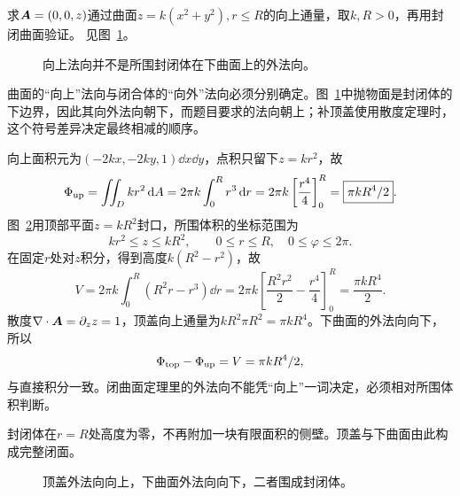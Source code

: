 \begin{exercise}[曲面通量的定向]\label{ex:c4-h4}
求$\bm{A}=(0,0,z)$通过曲面$z=k(x^2+y^2),r\le R$的向上通量，取$k,R>0$，再用封闭曲面验证。 见图~\ref{fig:c4-h4-q}。
\end{exercise}

\begin{figure}[H]\centering
{}
\caption{向上法向并不是所围封闭体在下曲面上的外法向。}\label{fig:c4-h4-q}
\end{figure}
\begin{solution}
曲面的“向上”法向与闭合体的“向外”法向必须分别确定。图~\ref{fig:c4-h4-q}中抛物面是封闭体的下边界，因此其向外法向朝下，而题目要求的法向朝上；补顶盖使用散度定理时，这个符号差异决定最终相减的顺序。


向上面积元为$(-2kx,-2ky,1)\dd x\dd y$，点积只留下$z=k r^2$，故
\[\Phi_{\rm up}=\iint_Dkr^2\mathop{}\!\mathrm d A
=2\pi k\int_0^Rr^3\mathop{}\!\mathrm d r
=2\pi k\left[\frac{r^4}{4}\right]_0^R
=\boxed{\pi kR^4/2}.\]
图~\ref{fig:c4-h4-s}用顶部平面$z=kR^2$封口，所围体积的坐标范围为
\[kr^2\le z\le kR^2,\qquad0\le r\le R,\quad0\le\varphi\le2\pi.\]
在固定$r$处对$z$积分，得到高度$k(R^2-r^2)$，故
\[V=2\pi k\int_0^R(R^2r-r^3)\dd r
=2\pi k\left[\frac{R^2r^2}{2}-\frac{r^4}{4}\right]_0^R
=\frac{\pi kR^4}{2}.\]
散度$\nabla\cdot\bm{A}=\partial_z z=1$，顶盖向上通量为$kR^2\pi R^2=\pi kR^4$。下曲面的外法向向下，所以
\[\Phi_{\rm top}-\Phi_{\rm up}=V=\pi kR^4/2,
\]
与直接积分一致。闭曲面定理里的外法向不能凭“向上”一词决定，必须相对所围体积判断。


封闭体在$r=R$处高度为零，不再附加一块有限面积的侧壁。顶盖与下曲面由此构成完整闭面。

\begin{figure}[H]\centering
{}
\caption{顶盖外法向向上，下曲面外法向向下，二者围成封闭体。}\label{fig:c4-h4-s}
\end{figure}
\end{solution}

